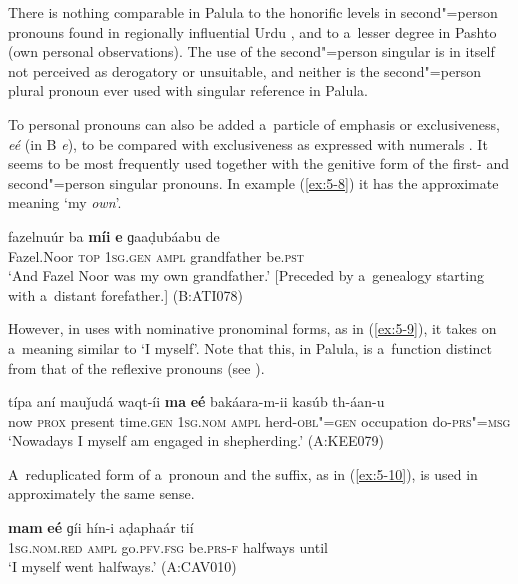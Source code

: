 There is nothing comparable in Palula to the honorific levels in second"=person pronouns found in regionally influential Urdu \citep[17]{schmidt1999}, and to a~lesser degree in Pashto (own personal observations). The use of the second"=person singular is in itself not perceived as derogatory or unsuitable, and neither is the second"=person plural pronoun ever used with singular reference in Palula.

To personal pronouns can also be added a~particle of emphasis or exclusiveness, \textit{eé} (in B \textit{e}), to be compared with exclusiveness as expressed with numerals . It seems to be most frequently used together with the genitive form of the first- and second"=person singular pronouns. In example (\ref{ex:5-8}) it has the approximate meaning `my \textit{own}'.



\begin{exe}
\ex
\label{ex:5-8}
\gll fazelnuúr ba \textbf{míi} \textbf{e} ɡaaḍubáabu de \\
	Fazel.Noor \textsc{top} \textsc{1sg.gen} \textsc{ampl} grandfather be.\textsc{pst} \\
\glt `And Fazel Noor was my own grandfather.' [Preceded by a~genealogy starting with a~distant forefather.] (B:ATI078)
\end{exe}

However, in uses with nominative pronominal forms, as in (\ref{ex:5-9}), it takes on a~meaning similar to `I myself'. Note that this, in Palula, is a~function distinct from that of the reflexive pronouns (see ).

\begin{exe}
\ex
\label{ex:5-9}
\gll típa aní mauǰudá waqt-íi \textbf{ma} \textbf{eé} bakáara-m-ii kasúb th-áan-u\\
	now \textsc{prox} present time.\textsc{gen} \textsc{1sg.nom} \textsc{ampl} herd-\textsc{obl"=gen} occupation do-\textsc{prs"=msg}\\
\glt `Nowadays I myself am engaged in shepherding.' (A:KEE079)
\end{exe}


A~reduplicated form of a~pronoun and the suffix, as in (\ref{ex:5-10}), is used in approximately the same sense.


\begin{exe}
\ex
\label{ex:5-10}
\gll \textbf{mam} \textbf{eé} ɡíi hín-i aḍaphaár tií\\
\textsc{1sg.nom.red} \textsc{ampl} go.\textsc{pfv.fsg} be.\textsc{prs-f} halfways until \\
\glt `I myself went halfways.' (A:CAV010)
\end{exe}


